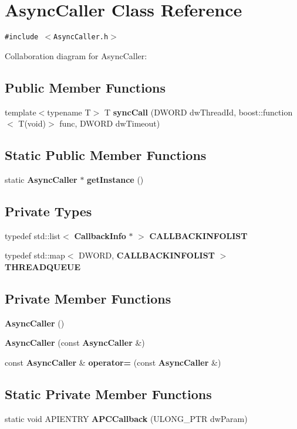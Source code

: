 \section{Async\-Caller Class Reference}
\label{class_async_caller}
{\tt \#include $<$Async\-Caller.h$>$}

Collaboration diagram for Async\-Caller:\subsection*{Public Member Functions}
\begin{CompactItemize}
\item 
template$<$typename T$>$ T {\bf sync\-Call} (DWORD dw\-Thread\-Id, boost::function$<$ T(void)$>$ func, DWORD dw\-Timeout)
\end{CompactItemize}
\subsection*{Static Public Member Functions}
\begin{CompactItemize}
\item 
static {\bf Async\-Caller} $\ast$ {\bf get\-Instance} ()
\end{CompactItemize}
\subsection*{Private Types}
\begin{CompactItemize}
\item 
typedef std::list$<$ {\bf Callback\-Info} $\ast$ $>$ {\bf CALLBACKINFOLIST}
\item 
typedef std::map$<$ DWORD, {\bf CALLBACKINFOLIST} $>$ {\bf THREADQUEUE}
\end{CompactItemize}
\subsection*{Private Member Functions}
\begin{CompactItemize}
\item 
{\bf Async\-Caller} ()
\item 
{\bf Async\-Caller} (const {\bf Async\-Caller} \&)
\item 
const {\bf Async\-Caller} \& {\bf operator=} (const {\bf Async\-Caller} \&)
\end{CompactItemize}
\subsection*{Static Private Member Functions}
\begin{CompactItemize}
\item 
static void APIENTRY {\bf APCCallback} (ULONG\_\-PTR dw\-Param)
\end{CompactItemize}
